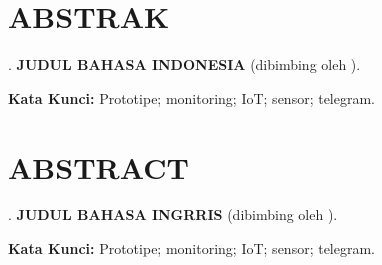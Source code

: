 \begingroup
\singlespacing
\chapter*{ABSTRAK}

\noindent
\NamaPenulis. \textbf{JUDUL BAHASA INDONESIA} (dibimbing oleh \NamaPembimbing). \par

\vspace*{0.1cm}

\noindent
\lipsum[1] \par

\vspace*{0.1cm}

\noindent
\textbf{Kata Kunci:} Prototipe; monitoring; IoT; sensor; telegram.

\endgroup

\newpage

\begingroup
\singlespacing
\chapter*{ABSTRACT}

\noindent
\NamaPenulis. \textbf{JUDUL BAHASA INGRRIS} (dibimbing oleh \NamaPembimbing). \par

\vspace*{0.1cm}
 
\noindent
\lipsum[1]


\vspace*{0.1cm}

\noindent
\textbf{Kata Kunci:} Prototipe; monitoring; IoT; sensor; telegram.

\endgroup
